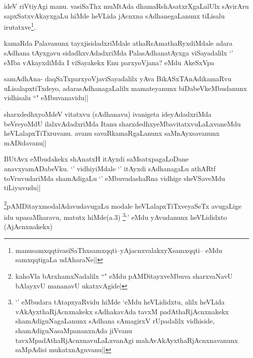 \begin{artha}
ideV riVtiyAgi manu. vasiSaThx muMtAda dhamaRshAsatxrXgaLalUlx sAvirAru sapxSatxvAkayxgaLu hiMde heVLida jAcnxna sAdhanegaLanunx tiLisalu irutatxve\footnote{manusamxqqti\stext \stext \stext \stext vasiSaThxsamxqqti--\stext \stext \stext \stext yAjacnxvalakxyXsamxqqti-- \stext \stext \stext \stext eMdu samxqqtigaLa udAharaNe||}.
\end{artha}


\begin{artha}
kamaRda Palavanunx tayxjisidadxriMdale athaRsAmathaRyxdiMdale adara sAdhana tAyxgavu sidadhxvAdadxriMda PalasAdhanatAyxga viSayadalilx `\stext' eMba vAkayxdiMda I viSayakekx Enu parxyoVjana? eMdu AkeSxVpa
\end{artha}

\begin{artha}
samAdhAna- daqSaTxparxyoVjaviSayadalilx yAva BikASxTAnAdikamaRvu uLisalapxtiTxdeyo, adarasAdhanagaLalilx mamateyanunx biDabeVkeMbudanunx vidhisalu ``\stext" eMbuvanavidu||
\end{artha}

\begin{artha}
sharxdedhxyoMdeV vitatxvu (sAdhanavu) ivanigeta ideyAdadxriMda beVreyoMdU ilalxvAdadxriMda Itanu sharxdedhxyeMbavitatxvuLaLxvaneMdu heVLalapxTiTxruvanu. avanu savaRkamaRgaLanunx saMnAyxsavanunx mADidavanu||
\end{artha}

\begin{artha}
BUtAvx eMbudakekx shAnatxH itAyxdi saMsatxpagaLoDane anavxyamADabeVku. `\stext' vidhiyiMdale `\stext' itAyxdi sAdhanagaLu athARtf toVruvudariMda shamAdigaLu `\stext' eMbuvadashaRna vidhige sheVSaveMdu tiLiyuvudu||
\end{artha}


\begin{artha}
\footnote{kahoVla bArxhamxNadalilx ``\stext" eMdu pAMDitayxveMbuva sharxvaNavU bAlayxvU mananavU ukatxvAgide|}pAMDitayxmodalAdavudavugaLu modale heVLalapxTiTxveyaSeTx avugaLige idu upasaMharavu, matutx hiMde(a.3) \footnote{`\stext' eMbudara tAtapxyaRvidu hiMde `\stext eMdu heVLididxtu, alilx heVLida vAkAyxthaRjAcnxnakekx sAdhakavAda tavxM padAthaRjAcnxnakekx shamAdiguNagaLanunx sAdhana sAmagirxV rUpadalilx vidhiside, shamAdiguNasaMpananxnAda jiVvanu tavxMpadAthaRjAcnxnavuLaLxvanAgi mahAvAkAyxthaRjAcnxnavanunx saMpAdisi mukatxnAguvanu||}`\stext' eMdu yAvudanunx heVLididxto (AjAcnxnakekx)
\end{artha}

